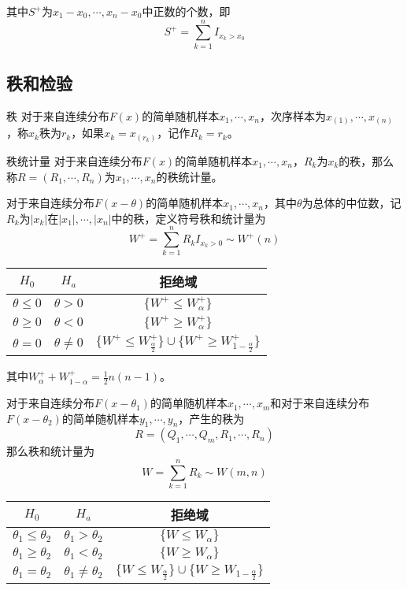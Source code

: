 \documentclass[lang = cn, scheme = chinese, thmcnt = section]{elegantbook}
\begin{document}
其中$S^+$为$x_1-x_0,\cdots,x_n-x_0$​中正数的个数，即
$$
S^+=\sum_{k=1}^{n}{I_{x_k> x_0}}
$$

\subsection{秩和检验}

\begin{definition}{秩}
	对于来自连续分布$F(x)$的简单随机样本$x_1,\cdots,x_n$，次序样本为$x_{(1)},\cdots,x_{(n)}$，称$x_k$秩为$r_k$，如果$x_k=x_{(r_k)}$，记作$R_k=r_k$。
\end{definition}

\begin{definition}{秩统计量}
	对于来自连续分布$F(x)$的简单随机样本$x_1,\cdots,x_n$，$R_k$为$x_k$的秩，那么称$R=(R_1,\cdots,R_n)$为$x_1,\cdots,x_n$的秩统计量。
\end{definition}

对于来自连续分布$F(x-\theta)$的简单随机样本$x_1,\cdots,x_n$，其中$\theta$为总体的中位数，记$R_k$为$|x_k|$在$|x_1|,\cdots,|x_n|$中的秩，定义符号秩和统计量为
$$
W^+=\sum_{k=1}^{n}{R_k I_{x_k>0}}\sim W^+(n)
$$

\begin{table}[H]
	\centering
	\renewcommand{\arraystretch}{1.5}
	\begin{tabular}{|c|c|c|}
		\hline
		$H_0$ & $H_a$ & 拒绝域 \\ \hline
		$\theta\le 0$ & $\theta>0$ & $\{W^+\le W^+_\alpha\}$ \\ \hline
		$\theta\ge 0$ & $\theta<0$ & $\{W^+\ge W^+_\alpha\}$ \\ \hline
		$\theta=0$ & $\theta\ne0$ & $\{ W^+\le W^+_{\frac{\alpha}{2}} \}\cup\{ W^+\ge W^+_{1-\frac{\alpha}{2}} \}$ \\ \hline
	\end{tabular}
\end{table}

其中$W^+_{\alpha}+W^+_{1-\alpha}=\frac{1}{2}n(n-1)$。

对于来自连续分布$F(x-\theta_1)$的简单随机样本$x_1,\cdots,x_m$和对于来自连续分布$F(x-\theta_2)$的简单随机样本$y_1,\cdots,y_n$，产生的秩为
$$
R=(Q_1,\cdots,Q_m,R_1,\cdots,R_n)
$$
那么秩和统计量为
$$
W=\sum_{k=1}^{n}{R_k}\sim W(m,n)
$$

\begin{table}[htbp]
	\centering
	\renewcommand{\arraystretch}{1.5}
	\begin{tabular}{|c|c|c|}
		\hline
		$H_0$ & $H_a$ & 拒绝域 \\ \hline
		$\theta_1\le \theta_2$ & $\theta_1>\theta_2$ & $\{W\le W_\alpha\}$ \\ \hline
		$\theta_1\ge \theta_2$ & $\theta_1<\theta_2$ & $\{W\ge W_\alpha\}$ \\ \hline
		$\theta_1=\theta_2$ & $\theta_1\ne\theta_2$ & $\{ W\le W_{\frac{\alpha}{2}} \}\cup\{ W\ge W_{1-\frac{\alpha}{2}} \}$ \\ \hline
	\end{tabular}
\end{table}
\end{document}
